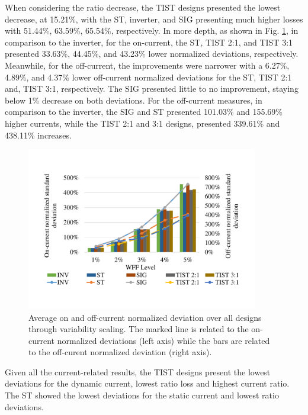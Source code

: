 \documentclass[diss,pgmicro,english]{iiufrgs}
\begin{document}
When considering the ratio decrease, the TIST designs presented the lowest decrease, at 15.21\%, with the ST, inverter, and SIG presenting much higher losses with 51.44\%, 63.59\%, 65.54\%, respectively. In more depth, as shown in Fig. \ref{fig:OnOffDev}, in comparison to the inverter, for the on-current, the ST, TIST 2:1, and TIST 3:1 presented 33.63\%, 44.45\%, and 43.23\% lower normalized deviations, respectively. Meanwhile, for the off-current, the improvements were narrower with a 6.27\%, 4.89\%, and 4.37\% lower off-current normalized deviations for the ST, TIST 2:1 and, TIST 3:1, respectively. The SIG presented little to no improvement, staying below 1\% decrease on both deviations. For the off-current measures, in comparison to the inverter, the SIG and ST presented 101.03\% and 155.69\% higher currents, while the TIST 2:1 and 3:1 designs, presented 339.61\% and 438.11\% increases.

    \begin{figure}[]
        \centering
            \includegraphics[width=0.9\textwidth, trim={1.25cm 1cm 2cm 3cm}, clip]{compOnOffCurr.pdf}
            \caption{Average on and off-current normalized deviation over all designs through variability scaling. The marked line is related to the on-current normalized deviations (left axis) while the bars are related to the off-curent normalized deviation (right axis).}
        \label{fig:OnOffDev}
    \end{figure}


Given all the current-related results, the TIST designs present the lowest deviations for the dynamic current, lowest ratio loss and highest current ratio. The ST showed the lowest deviations for the static current and lowest ratio deviations.
\end{document}
